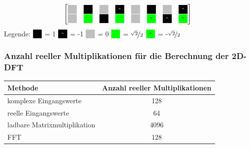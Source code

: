 \begin{frame}
\begin{center}
\begin{minipage}{0.9\textwidth}
\begin{center}
\[{\begin{bmatrix}
     \myboxZero 	& \myboxOnePos 		& \myboxZero 	& \myboxOneNeg 		& \myboxZero 	& \myboxOnePos 		& \myboxZero 	& \myboxOneNeg \\
     \myboxZero 	& \myboxSqrtPos 	& \myboxOnePos 	& \myboxSqrtPos		& \myboxZero	& \myboxSqrtNeg		& \myboxOneNeg	& \myboxSqrtNeg 
    \end{bmatrix}
   }
  \]
\vspace{0.5cm}
  Legende: $\myboxOnePos$ = 1 \quad $\myboxOneNeg$ = -1 \quad $\myboxZero$ = 0 \quad $\myboxSqrtPos$ = $\nicefrac{\sqrt{2}}{2}$ \quad $\myboxSqrtNeg$ = -$\nicefrac{\sqrt{2}}{2}$
  \label{pic:MatrizenDarstellungTwiddlefaktoren}
\end{center}
\endgroup
\end{minipage}
\end{center}

\end{frame}



\begin{frame}\frametitle{Anzahl reeller Multiplikationen für die Berechnung der 2D-DFT}

\begin{table}[ht!]
\centering
 \begin{tabular}{lc}
  \hline
  Methode  & Anzahl reeller Multiplikationen\\
  \hline
  komplexe Eingangswerte & 128\\
  reelle Eingangswerte   & 64\\
  ladbare Matrixmultiplikation & 4096\\
  FFT   & 128\\
  \hline
 \end{tabular}
 \label{tab:AuflistungMultiplikationen}
\end{table} 
\end{frame}


